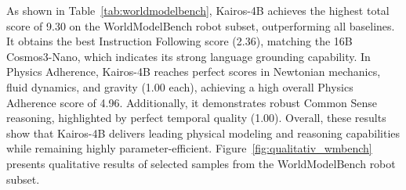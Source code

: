 As shown in Table~\ref{tab:worldmodelbench}, Kairos-4B achieves the highest total score of 9.30 on the WorldModelBench robot subset, outperforming all baselines. It obtains the best Instruction Following score (2.36), matching the 16B Cosmos3-Nano, which indicates its strong language grounding capability. In Physics Adherence, Kairos-4B reaches perfect scores in Newtonian mechanics, fluid dynamics, and gravity (1.00 each), achieving a high overall Physics Adherence score of 4.96. Additionally, it demonstrates robust Common Sense reasoning, highlighted by perfect temporal quality (1.00). Overall, these results show that Kairos-4B delivers leading physical modeling and reasoning capabilities while remaining highly parameter-efficient.  Figure~\ref{fig:qualitativ_wmbench} presents qualitative results of selected samples from the WorldModelBench robot subset.


